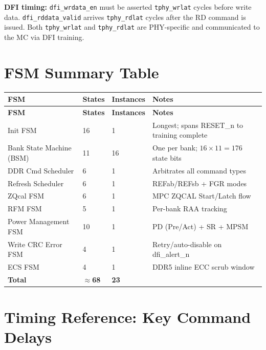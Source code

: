 \documentclass[11pt,a4paper]{article}
\begin{document}
\begin{notebox}
\textbf{DFI timing:} \texttt{dfi\_wrdata\_en} must be asserted \texttt{tphy\_wrlat} cycles before write data.
\texttt{dfi\_rddata\_valid} arrives \texttt{tphy\_rdlat} cycles after the RD command is issued.
Both \texttt{tphy\_wrlat} and \texttt{tphy\_rdlat} are PHY-specific and communicated to the MC via DFI training.
\end{notebox}

\section{FSM Summary Table}

\begin{longtable}{L{4cm} C{1.6cm} C{2cm} L{6.8cm}}
\toprule
\textbf{FSM} & \textbf{States} & \textbf{Instances} & \textbf{Notes} \\
\midrule
\endfirsthead\toprule\textbf{FSM}&\textbf{States}&\textbf{Instances}&\textbf{Notes}\\\midrule\endhead\bottomrule\endfoot
{}
Init FSM                    & 16 & 1  & Longest; spans RESET\_n to training complete \\
Bank State Machine (BSM)    & 11 & 16 & One per bank; $16\times11=176$ state bits \\
DDR Cmd Scheduler           & 6  & 1  & Arbitrates all command types \\
Refresh Scheduler           & 6  & 1  & REFab/REFsb + FGR modes \\
ZQcal FSM                   & 6  & 1  & MPC ZQCAL Start/Latch flow \\
RFM FSM                     & 5  & 1  & Per-bank RAA tracking \\
Power Management FSM        & 10 & 1  & PD (Pre/Act) + SR + MPSM \\
Write CRC Error FSM         & 4  & 1  & Retry/auto-disable on dfi\_alert\_n \\
ECS FSM                     & 4  & 1  & DDR5 inline ECC scrub window \\
\midrule
{}
\textbf{Total} & \textbf{$\approx$68} & \textbf{23} & \\
\end{longtable}

\section{Timing Reference: Key Command Delays}
\end{document}
